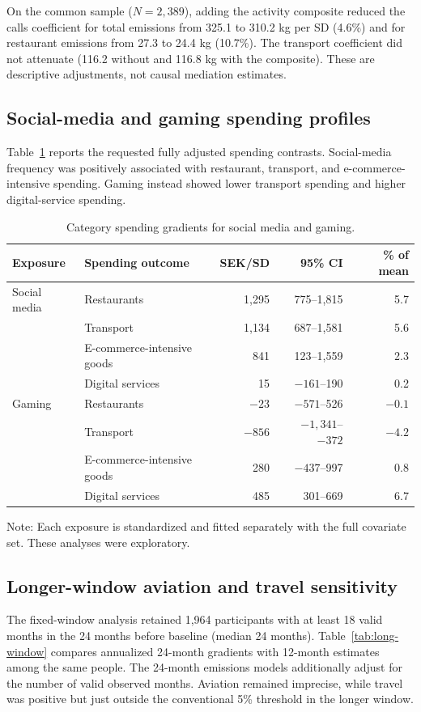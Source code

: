 \documentclass[11pt,a4paper]{article}
\begin{document}
On the common sample ($N=2,389$), adding the activity composite reduced the
calls coefficient for total emissions from 325.1 to 310.2 kg per SD (4.6\%)
and for restaurant emissions from 27.3 to 24.4 kg (10.7\%). The transport
coefficient did not attenuate (116.2 without and 116.8 kg with the composite).
These are descriptive adjustments, not causal mediation estimates.

\subsection{Social-media and gaming spending profiles}
Table~\ref{tab:social-spending} reports the requested fully adjusted spending
contrasts. Social-media frequency was positively associated with restaurant,
transport, and e-commerce-intensive spending. Gaming instead showed lower
transport spending and higher digital-service spending.

\begin{table}[htbp]
	\centering
	\caption{Category spending gradients for social media and gaming.}
	\label{tab:social-spending}
	\begin{tabular}{@{}llrrr@{}}
		\toprule
		Exposure & Spending outcome & SEK/SD & 95\% CI & \% of mean \\
		\midrule
		Social media & Restaurants & 1,295 & 775--1,815 & 5.7 \\
		 & Transport & 1,134 & 687--1,581 & 5.6 \\
		 & E-commerce-intensive goods & 841 & 123--1,559 & 2.3 \\
		 & Digital services & 15 & $-161$--190 & 0.2 \\
		Gaming & Restaurants & $-23$ & $-571$--526 & $-0.1$ \\
		 & Transport & $-856$ & $-1,341$--$-372$ & $-4.2$ \\
		 & E-commerce-intensive goods & 280 & $-437$--997 & 0.8 \\
		 & Digital services & 485 & 301--669 & 6.7 \\
		\bottomrule
	\end{tabular}
	\begin{flushleft}\footnotesize
		Note: Each exposure is standardized and fitted separately with the full
		covariate set. These analyses were exploratory.
	\end{flushleft}
\end{table}

\subsection{Longer-window aviation and travel sensitivity}
The fixed-window analysis retained 1,964 participants with at least 18 valid
months in the 24 months before baseline (median 24 months). Table~\ref{tab:long-window}
compares annualized 24-month gradients with 12-month estimates among the same
people. The 24-month emissions models additionally adjust for the number of
valid observed months. Aviation remained imprecise, while travel was positive
but just outside the conventional 5\% threshold in the longer window.
\end{document}
